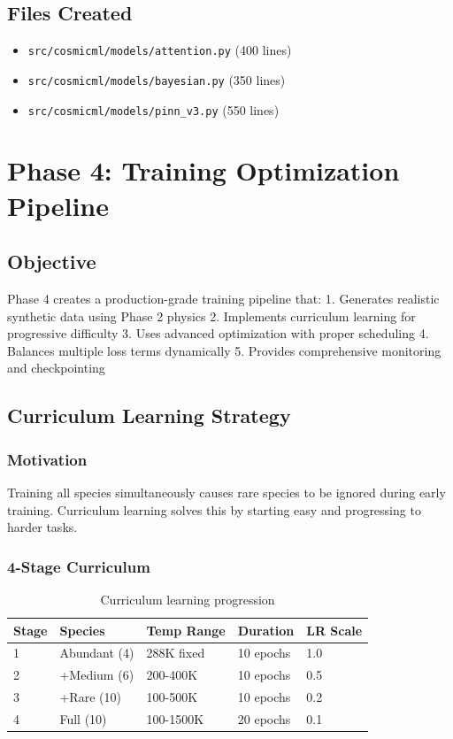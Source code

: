 \documentclass[12pt,a4paper,oneside]{report}
\begin{document}
\section{Files Created}

\begin{itemize}
    \item \texttt{src/cosmicml/models/attention.py} (400 lines)
    \item \texttt{src/cosmicml/models/bayesian.py} (350 lines)
    \item \texttt{src/cosmicml/models/pinn\_v3.py} (550 lines)
\end{itemize}

\newpage
\chapter{Phase 4: Training Optimization Pipeline}

\section{Objective}

Phase 4 creates a production-grade training pipeline that:
1. Generates realistic synthetic data using Phase 2 physics
2. Implements curriculum learning for progressive difficulty
3. Uses advanced optimization with proper scheduling
4. Balances multiple loss terms dynamically
5. Provides comprehensive monitoring and checkpointing

\section{Curriculum Learning Strategy}

\subsection{Motivation}

Training all species simultaneously causes rare species to be ignored during early training. Curriculum learning solves this by starting easy and progressing to harder tasks.

\subsection{4-Stage Curriculum}

\begin{table}[H]
\centering
\begin{tabular}{|l|l|l|l|l|}
\hline
\textbf{Stage} & \textbf{Species} & \textbf{Temp Range} & \textbf{Duration} & \textbf{LR Scale} \\
\hline
1 & Abundant (4) & 288K fixed & 10 epochs & 1.0 \\
2 & +Medium (6) & 200-400K & 10 epochs & 0.5 \\
3 & +Rare (10) & 100-500K & 10 epochs & 0.2 \\
4 & Full (10) & 100-1500K & 20 epochs & 0.1 \\
\hline
\end{tabular}
\caption{Curriculum learning progression}
\end{table}
\end{document}
